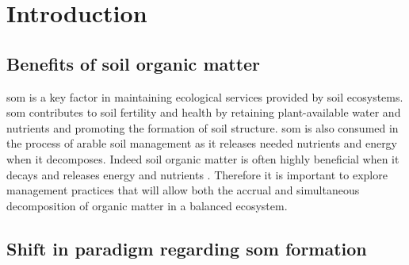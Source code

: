 \documentclass[12pt]{report}
\begin{document}
	\chapter{Introduction}
	
		\section{Benefits of soil organic matter}
		
		
		\gls{som} is a key factor in maintaining ecological services provided by soil ecosystems.
		\gls{som} contributes to soil fertility and health by retaining plant-available water and nutrients and promoting the formation of soil structure. \gls{som} is also consumed in the process of arable soil management as it releases needed nutrients and energy when it decomposes. Indeed soil organic matter is often highly beneficial when it decays and releases energy and nutrients \citep{lehmann2015, janzen2006}. Therefore it is important to explore  management practices that will allow both the accrual and simultaneous  decomposition of organic matter in a balanced ecosystem.
		
		\section{Shift in paradigm regarding \gls{som} formation}
		
\end{document}
